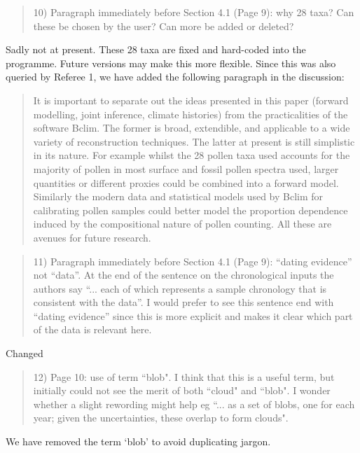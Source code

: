 \documentclass[a4paper,11pt]{article}
\begin{document}
\begin{framed} \begin{quote}
10) Paragraph immediately before Section 4.1 (Page 9): why 28 taxa?  Can these be chosen by the user? Can more be added or deleted?
\end{quote} \end{framed}
Sadly not at present. These 28 taxa are fixed and hard-coded into the programme. Future versions may make this more flexible. Since this was also queried by Referee 1, we have added the following paragraph in the discussion:

\begin{quote}
It is important to separate out the ideas presented in this paper (forward modelling, joint inference, climate histories) from the practicalities of the software Bclim. The former is broad, extendible, and applicable to a wide variety of reconstruction techniques. The latter at present is still simplistic in its nature. For example whilst the 28 pollen taxa used accounts for the majority of pollen in most surface and fossil pollen spectra used, larger quantities or different proxies could be combined into a forward model. Similarly the modern data and statistical models used by Bclim for calibrating pollen samples could better model the proportion dependence induced by the compositional nature of pollen counting. All these are avenues for future research.
\end{quote}

\begin{framed} \begin{quote}
11)  Paragraph immediately before Section 4.1 (Page 9): ``dating evidence'' not ``data''.  At the end of the sentence on the chronological inputs the authors say ``... each of which represents a sample chronology that is consistent with the data''.  I would prefer to see this sentence end with ``dating evidence'' since this is more explicit and makes it clear which part of the data is relevant here.
\end{quote} \end{framed}
Changed

\begin{framed} \begin{quote}
12) Page 10: use of term ``blob".  I think that this is a useful term, but initially could not see the merit of both ``cloud" and ``blob".  I wonder whether a slight rewording might help eg ``... as a set of blobs, one for each year; given the uncertainties, these overlap to form clouds".
\end{quote} \end{framed}
We have removed the term `blob' to avoid duplicating jargon.
\end{document}
